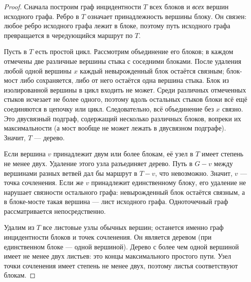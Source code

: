 \begin{proof}
Сначала построим граф инцидентности \(T\) всех блоков и \emph{всех}
вершин исходного графа. Ребро в \(T\) означает принадлежность вершины блоку.
Он связен: любое ребро исходного графа лежит в блоке, поэтому путь
исходного графа превращается в чередующийся маршрут по \(T\).

Пусть в \(T\) есть простой цикл. Рассмотрим объединение его блоков;
в каждом отмечены две различные вершины стыка с соседними блоками.
После удаления любой одной вершины \(x\) каждый невырожденный блок
остаётся связным; блок-мост либо сохраняется, либо от него остаётся
одна вершина стыка. Блок из изолированной вершины в цикл входить не может.
Среди различных отмеченных стыков исчезает не более одного,
поэтому вдоль остальных стыков блоки всё ещё соединяются в цепочку
или цикл. Следовательно, всё объединение без \(x\) связно.
Это двусвязный подграф, содержащий несколько различных блоков,
вопреки их максимальности (а мост вообще не может лежать в двусвязном подграфе).
Значит, \(T\) — дерево.

Если вершина \(v\) принадлежит двум или более блокам, её узел в \(T\)
имеет степень не менее двух. Удаление этого узла разъединяет дерево.
Путь в \(G-v\) между вершинами разных ветвей дал бы маршрут в
\(T-v\), что невозможно. Значит, \(v\) — точка сочленения.
Если же \(v\) принадлежит единственному блоку, его удаление не нарушает
связности остального графа: невырожденный блок остаётся связным,
а в блоке-мосте такая вершина — лист исходного графа.
Одноточечный граф рассматривается непосредственно.

Удалим из \(T\) все листовые узлы обычных вершин; останется именно
граф инцидентности блоков и точек сочленения. Он является деревом
(при единственном блоке — одной вершиной).
Дерево с более чем одной вершиной имеет не менее двух листьев:
это концы максимального простого пути. Узел точки сочленения
имеет степень не менее двух, поэтому листья соответствуют блокам.
\end{proof}


